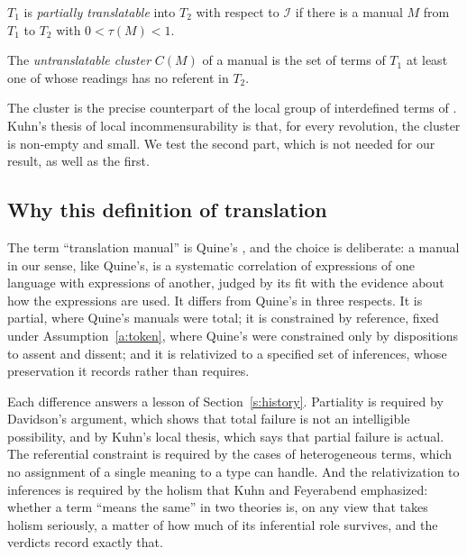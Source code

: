 \documentclass{situationist-preprint}
\begin{document}
\begin{definition}\label{d:partial}
$T_1$ is \emph{partially translatable} into $T_2$ with respect to $\mathcal{I}$ if there is a manual $M$ from $T_1$ to $T_2$ with $0 < \tau(M) < 1$.
\end{definition}

\begin{definition}\label{d:cluster}
The \emph{untranslatable cluster} $C(M)$ of a manual is the set of terms of $T_1$ at least one of whose readings has no referent in $T_2$.
\end{definition}

The cluster is the precise counterpart of the local group of interdefined terms of \citet{Kuhn1983}. Kuhn's thesis of local incommensurability is that, for every revolution, the cluster is non-empty and small. We test the second part, which is not needed for our result, as well as the first.

\subsection{Why this definition of translation}

The term \enquote{translation manual} is Quine's \citep{Quine1960}, and the choice is deliberate: a manual in our sense, like Quine's, is a systematic correlation of expressions of one language with expressions of another, judged by its fit with the evidence about how the expressions are used. It differs from Quine's in three respects. It is partial, where Quine's manuals were total; it is constrained by reference, fixed under Assumption~\ref{a:token}, where Quine's were constrained only by dispositions to assent and dissent; and it is relativized to a specified set of inferences, whose preservation it records rather than requires.

Each difference answers a lesson of Section~\ref{s:history}. Partiality is required by Davidson's argument, which shows that total failure is not an intelligible possibility, and by Kuhn's local thesis, which says that partial failure is actual. The referential constraint is required by the cases of heterogeneous terms, which no assignment of a single meaning to a type can handle. And the relativization to inferences is required by the holism that Kuhn and Feyerabend emphasized: whether a term \enquote{means the same} in two theories is, on any view that takes holism seriously, a matter of how much of its inferential role survives, and the verdicts record exactly that.
\end{document}
